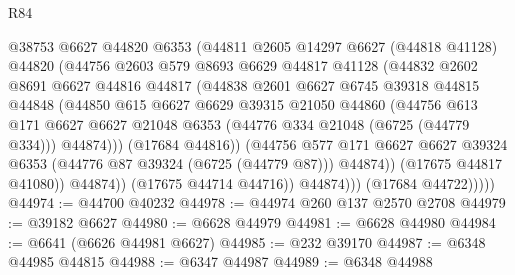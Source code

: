 \begin{lexlean}{R84}
\begin{coremodule}
                        @38753
                        @6627
                        @44820
                        @6353
                        (@44811
                          @2605
                          @14297
                          @6627
                          (@44818 @41128)
                          @44820
                          (@44756
                            @2603
                            @579
                            @8693
                            @6629
                            @44817
                            @41128
                            (@44832
                              @2602
                              @8691
                              @6627
                              @44816
                              @44817
                              (@44838
                                @2601
                                @6627
                                @6745
                                @39318
                                @44815
                                @44848
                                (@44850
                                  @615
                                  @6627
                                  @6629
                                  @39315
                                  @21050
                                  @44860
                                  (@44756
                                    @613
                                    @171
                                    @6627
                                    @6627
                                    @21048
                                    @6353
                                    (@44776 @334 @21048 (@6725 (@44779 @334)))
                                    @44874)))
                              (@17684 @44816))
                            (@44756
                              @577
                              @171
                              @6627
                              @6627
                              @39324
                              @6353
                              (@44776 @87 @39324 (@6725 (@44779 @87)))
                              @44874))
                          (@17675 @44817 @41080))
                        @44874))
                    (@17675 @44714 @44716))
                  @44874)))
            (@17684 @44722)))))
@44974 := @44700 @40232
@44978 := @44974 @260 @137 @2570 @2708
@44979 := @39182 @6627
@44980 := @6628 @44979
@44981 := @6628 @44980
@44984 := @6641 (@6626 @44981 @6627)
@44985 := @232 @39170
@44987 := @6348 @44985 @44815
@44988 := @6347 @44987
@44989 := @6348 @44988

\end{coremodule}
\end{lexlean}
